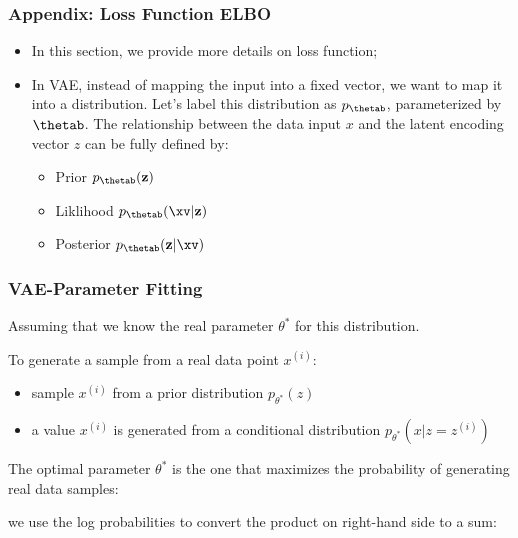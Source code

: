 \begin{frame}
\frametitle{Appendix: Loss Function ELBO }

\begin{itemize}
\item In this section, we provide more details on loss function; 
\item In VAE, instead of mapping the input into a fixed vector, we want to map it into a distribution. Let's label this distribution as $p_{\thetab}$, parameterized by ${\thetab}$. The relationship between the data input $x$ and the latent encoding vector $z$ can be fully defined by:

  \begin{itemize}
    \item Prior $p_{\thetab}(\mathbf{z})$
    \item Liklihood $p_{\thetab}( \xv|\mathbf{z})$
    \item Posterior $p_{\thetab}(\mathbf{z} | \xv)$
  \end{itemize}
\end{itemize}

\end{frame}



\begin{frame}
\frametitle{VAE-Parameter Fitting}
\vspace{2mm}

Assuming that we know the real parameter ${\theta}^*$ for this distribution. 

To generate a sample from a real data point $x^{(i)}$:

\begin{itemize}
\item sample $x^{(i)}$ from a prior distribution $p_{{\theta}^*} (z)$
\item a value $x^{(i)}$ is generated from a conditional distribution $p_{{\theta}^*} (x|z=z^{(i)})$ 
\end{itemize}

\vspace{1mm}
The optimal parameter ${\theta}^*$ is the one that maximizes the probability of generating real data samples:

\vspace{2mm}
\vspace{2mm}

we use the log probabilities to convert the product on right-hand side to a sum:

\vspace{2mm}

\end{frame}  

